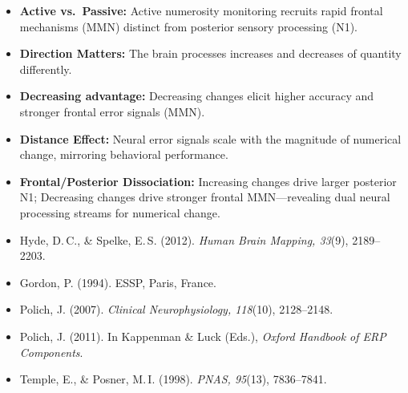 \vfill

\begin{tcolorbox}[posterbox]
\SmallText
\begin{itemize}
  \item \textbf{Active vs.\ Passive:} Active numerosity monitoring recruits rapid frontal mechanisms (MMN) distinct from posterior sensory processing (N1).
  \item \textbf{Direction Matters:} The brain processes increases and decreases of quantity differently.
  \item \textbf{Decreasing advantage:} Decreasing changes elicit higher accuracy and stronger frontal error signals (MMN).
  \item \textbf{Distance Effect:} Neural error signals scale with the magnitude of numerical change, mirroring behavioral performance.
  \item \textbf{Frontal/Posterior Dissociation:} Increasing changes drive larger posterior N1; Decreasing changes drive stronger frontal MMN---revealing dual neural processing streams for numerical change.
\end{itemize}
\end{tcolorbox}

\vspace{0.06in}

\begin{tcolorbox}[posterbox]
{\fontsize{20}{24}\selectfont
\begin{itemize}
  \item Hyde, D.\,C., \& Spelke, E.\,S. (2012). \textit{Human Brain Mapping, 33}(9), 2189--2203.
  \item Gordon, P. (1994). ESSP, Paris, France.
  \item Polich, J. (2007). \textit{Clinical Neurophysiology, 118}(10), 2128--2148.
  \item Polich, J. (2011). In Kappenman \& Luck (Eds.), \textit{Oxford Handbook of ERP Components}.
  \item Temple, E., \& Posner, M.\,I. (1998). \textit{PNAS, 95}(13), 7836--7841.
\end{itemize}
}
\end{tcolorbox}
